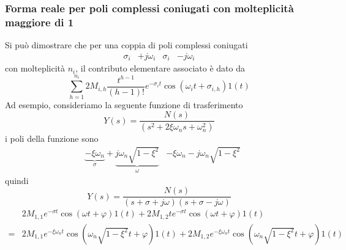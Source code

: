 \documentclass{article}
\numberwithin{equation}{subsection}
\begin{document}
\subsubsection{Forma reale per poli complessi coniugati con molteplicità maggiore di 1}
Si può dimostrare che per una coppia di poli complessi coniugati
\begin{align*}
    \sigma_i &+ j \omega_i  & \sigma_i &- j \omega_i 
\end{align*}
con molteplicità $n_i$, il contributo elementare associato è dato da
\begin{equation}
    \sum_{h=1}^{n_i} 2M_{i,h} \frac{t^{h-1}}{(h-1)!} e^{-\sigma_i t} \cos(\omega_i t + \sigma_{i,h}) 1(t)
\end{equation}
Ad esempio, consideriamo la seguente funzione di trasferimento
\[
    Y(s) = \frac{N(s)}{(s^2+2 \xi \omega_ns + \omega_n^2)}    
\]
i poli della funzione sono
\begin{align*}
    &\underbrace{-\xi \omega_n}_{\sigma} + \underbrace{j \omega_n \sqrt{1-\xi^2}}_{\omega} & -\xi \omega_n - j \omega_n \sqrt{1-\xi^2}
\end{align*}
quindi
\[
    Y(s) = \frac{N(s)}{(s + \sigma + j \omega) (s + \sigma - j \omega)}
\]
\begin{align*}
    &2M_{1,1}e^{-\sigma t}\cos(\omega t+\varphi)1(t) + 2M_{1,2}t e^{-\sigma t} \cos(\omega t + \varphi)1(t)\\ =& 2M_{1,1}e^{-\xi \omega_n t} \cos(\omega_n \sqrt{1 - \xi^2}t+\varphi)1(t) + 2M_{1,2}e^{-\xi \omega_n t} \cos(\omega_n \sqrt{1 - \xi^2}t+\varphi)1(t)
\end{align*}
\end{document}
